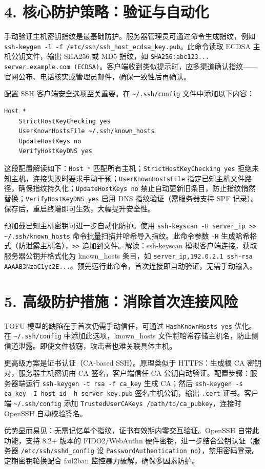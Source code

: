 \chapter{4. 核心防护策略：验证与自动化}
手动验证主机密钥指纹是最基础防护。服务器管理员可通过命令生成指纹，例如 \texttt{ssh-keygen -l -f /etc/ssh/ssh\_{}host\_{}ecdsa\_{}key.pub}。此命令读取 ECDSA 主机公钥文件，输出 SHA256 或 MD5 指纹，如 \texttt{SHA256:abc123... server.example.com (ECDSA)}。客户端收到类似提示时，应多渠道确认指纹——官网公布、电话核实或管理员邮件，确保一致性后再确认。\par
配置 SSH 客户端安全选项至关重要。在 \texttt{\~{}/.ssh/config} 文件中添加以下内容：\par
\begin{lstlisting}
Host *
    StrictHostKeyChecking yes
    UserKnownHostsFile ~/.ssh/known_hosts
    UpdateHostKeys no
    VerifyHostKeyDNS yes
\end{lstlisting}
这段配置解读如下：\texttt{Host *} 匹配所有主机；\texttt{StrictHostKeyChecking yes} 拒绝未知主机，连接失败时要求手动干预；\texttt{UserKnownHostsFile} 指定已知主机文件路径，确保指纹持久化；\texttt{UpdateHostKeys no} 禁止自动更新旧条目，防止指纹悄然替换；\texttt{VerifyHostKeyDNS yes} 启用 DNS 指纹验证（需服务器支持 SPF 记录）。保存后，重启终端即可生效，大幅提升安全性。\par
预加载已知主机密钥可进一步自动化防护。使用 \texttt{ssh-keyscan -H server\_{}ip >> \~{}/.ssh/known\_{}hosts} 命令批量扫描并哈希导入指纹。此命令参数 \texttt{-H} 生成哈希格式（防泄露主机名），\texttt{>>} 追加到文件。解读：ssh-keyscan 模拟客户端连接，获取服务器公钥并格式化为 known\_{}hosts 条目，如 \texttt{server\_{}ip,192.0.2.1 ssh-rsa AAAAB3NzaC1yc2E...}。预先运行此命令，首次连接即自动验证，无需手动输入。\par
\chapter{5. 高级防护措施：消除首次连接风险}
TOFU 模型的缺陷在于首次仍需手动信任，可通过 \texttt{HashKnownHosts yes} 优化。在 \texttt{\~{}/.ssh/config} 中添加此选项，known\_{}hosts 文件将哈希存储主机名，防止侧信道泄露。即使文件被窃，攻击者也难关联具体主机。\par
更高级方案是证书认证（CA-based SSH）。原理类似于 HTTPS：生成根 CA 密钥对，服务器主机密钥由 CA 签名，客户端信任 CA 公钥自动验证。配置步骤：服务器端运行 \texttt{ssh-keygen -t rsa -f ca\_{}key} 生成 CA；然后 \texttt{ssh-keygen -s ca\_{}key -I host\_{}id -h server\_{}key.pub} 签名主机公钥，输出 \texttt{.cert} 证书。客户端 \texttt{\~{}/.ssh/config} 添加 \texttt{TrustedUserCAKeys /path/to/ca\_{}pubkey}，连接时 OpenSSH 自动校验签名。\par
优势显而易见：无需记忆单个指纹，证书有效期内零交互验证。OpenSSH 自带此功能，支持 8.2+ 版本的 FIDO2/WebAuthn 硬件密钥，进一步结合公钥认证（服务器 \texttt{/etc/ssh/sshd\_{}config} 设 \texttt{PasswordAuthentication no}），禁用密码登录。定期密钥轮换配合 fail2ban 监控暴力破解，确保多因素防护。\par
